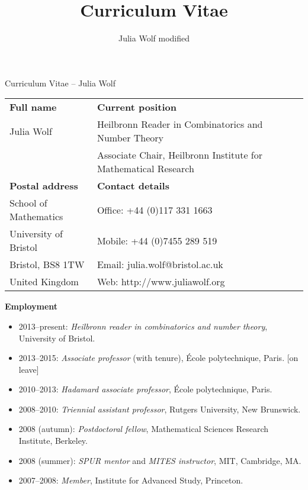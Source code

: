 \documentclass[11pt]{article}
\title{Curriculum Vitae}
\author{Julia Wolf modified}
\date{}
\newenvironment{mitemize}{
\begin{itemize}
  \setlength{\itemsep}{1pt}
  \setlength{\parskip}{0pt}
  \setlength{\parsep}{0pt}
}{\end{itemize}}
\begin{document}
\hline

\begin{center}\large{Curriculum Vitae -- Julia Wolf} \end{center}

\hline



\begin{table}[ht]
\begin{flushleft}\hspace{-9pt}
\begin{tabular}[t]{ll}
\vspace{3pt}\textbf{Full name} & \textbf{Current position}\\
\vspace{7pt}Julia Wolf & Heilbronn Reader in Combinatorics and Number Theory\vspace{-8pt}\\ & Associate Chair, Heilbronn Institute for Mathematical Research\vspace{5pt}\\
\vspace{3pt}\textbf{Postal address} & \textbf{Contact details}\\
School of Mathematics \hspace{20pt}\;& Office: +44 (0)117 331 1663\\
University of Bristol & Mobile: +44 (0)7455 289 519\\
Bristol, BS8 1TW & Email: julia.wolf@bristol.ac.uk\\
United Kingdom & Web: http://www.juliawolf.org \\
\end{tabular}
\end{flushleft}
\end{table}
\vspace{-13pt}

\textbf{Employment}
\begin{mitemize}

\item 2013--present: \textit{Heilbronn reader in combinatorics and number theory}, University of Bristol.
\item 2013--2015: \textit{Associate professor} (with tenure), \'Ecole polytechnique, Paris. [on leave]
\item 2010--2013: \textit{Hadamard associate professor}, \'Ecole polytechnique, Paris.
\item 2008--2010: \textit{Triennial assistant professor}, Rutgers University, New Brunswick.
\item 2008 (autumn): \textit{Postdoctoral fellow}, Mathematical Sciences Research Institute, Berkeley.
\item 2008 (summer): \textit{SPUR mentor} and \textit{MITES instructor}, MIT, Cambridge, MA.
\item 2007--2008: \textit{Member}, Institute for Advanced Study, Princeton.
\end{mitemize}
\end{document}
